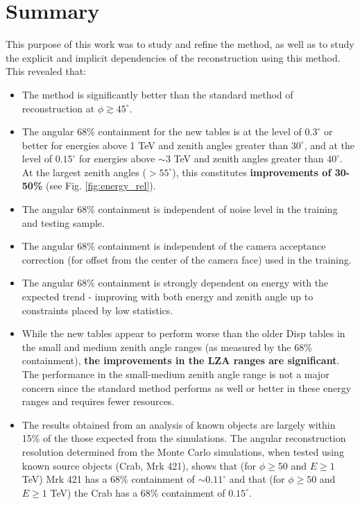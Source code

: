\documentclass[main.tex]{subfiles}
\begin{document}
\section{Summary}
This purpose of this work was to study and refine the \disp method, as well as to study the explicit and implicit dependencies of the reconstruction using this method. This revealed that:

\begin{itemize}
\item The \disp method is significantly better than the standard method of reconstruction at $\phi\gtrsim45^\circ$.
\item The angular 68\% containment for the new \disp tables is at the level of $0.3^\circ$ or better for energies above 1 TeV and zenith angles greater than $30^\circ$, and at the level of $0.15^\circ$ for energies above $\sim$3 TeV and zenith angles greater than $40^\circ$. At the largest zenith angles ($>55^\circ$), this constitutes {\bf improvements of 30-50\%} (see Fig. \ref{fig:energy_rel}).
\item The angular 68\% containment is independent of noise level in the training and testing sample.
\item The angular 68\% containment is independent of the camera acceptance correction (for offset from the center of the camera face) used in the training.
\item The angular 68\% containment is strongly dependent on energy with the expected trend - improving with both energy and zenith angle up to constraints placed by low statistics.
\item While the new \disp tables appear to perform worse than the older Disp tables in the small and medium zenith angle ranges (as measured by the 68\% containment), \textbf{the improvements in the LZA ranges are significant}. The performance in the small-medium zenith angle range is not a major concern since the standard method performs as well or better in these energy ranges and requires fewer resources.
\item The results obtained from an analysis of known objects are largely within 15\% of the those expected from the simulations. The angular reconstruction resolution determined from the Monte Carlo simulations, when tested using known source objects (Crab, Mrk 421), shows that (for $\phi\geq50$ and $E\geq 1$ TeV) Mrk 421 has a 68\% containment of $\sim 0.11^\circ$ and that (for $\phi\geq50$ and $E\geq 1$ TeV) the Crab has a 68\% containment of $0.15^\circ$.
\end{itemize}
\end{document}
